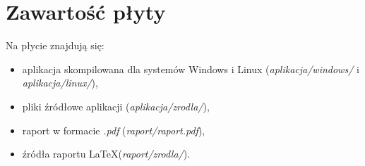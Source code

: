 \section{Zawartość płyty}
Na płycie znajdują się:
\begin{itemize}
\item aplikacja skompilowana dla systemów Windows i Linux (\emph{aplikacja/windows/} i \emph{aplikacja/linux/}),
\item pliki źródłowe aplikacji (\emph{aplikacja/zrodla/}),
\item raport w formacie \emph{.pdf} (\emph{raport/raport.pdf}),
\item źródła raportu \LaTeX (\emph{raport/zrodla/}).
\end{itemize}
